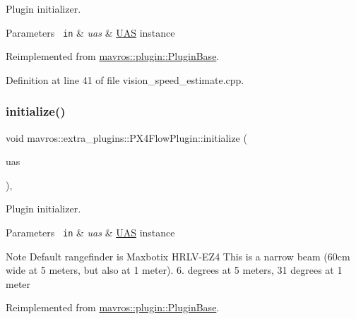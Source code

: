 Plugin initializer. 


\begin{DoxyParams}[1]{Parameters}
\mbox{\texttt{ in}}  & {\em uas} & {\ttfamily \mbox{\hyperlink{classmavros_1_1UAS}{U\+AS}}} instance \\
\hline
\end{DoxyParams}


Reimplemented from \mbox{\hyperlink{group__plugin_gad5313a41da4d26acbbabf008cdc21e82}{mavros\+::plugin\+::\+Plugin\+Base}}.



Definition at line 41 of file vision\+\_\+speed\+\_\+estimate.\+cpp.

\mbox{\label{group__plugin_ga6b15368f120713a52cb776ad210a052b}} 
\subsubsection{\texorpdfstring{initialize()}{initialize()}\hspace{0.1cm}{\footnotesize\ttfamily [21/41]}}
{\footnotesize\ttfamily void mavros\+::extra\+\_\+plugins\+::\+P\+X4\+Flow\+Plugin\+::initialize (\begin{DoxyParamCaption}\item[{\mbox{\hyperlink{classmavros_1_1UAS}{U\+AS}} \&}]{uas }\end{DoxyParamCaption})\hspace{0.3cm}{\ttfamily [inline]}, {\ttfamily [virtual]}}



Plugin initializer. 


\begin{DoxyParams}[1]{Parameters}
\mbox{\texttt{ in}}  & {\em uas} & {\ttfamily \mbox{\hyperlink{classmavros_1_1UAS}{U\+AS}}} instance \\
\hline
\end{DoxyParams}
\begin{DoxyNote}{Note}
Default rangefinder is Maxbotix H\+R\+L\+V-\/\+E\+Z4 This is a narrow beam (60cm wide at 5 meters, but also at 1 meter). 6. degrees at 5 meters, 31 degrees at 1 meter
\end{DoxyNote}


Reimplemented from \mbox{\hyperlink{group__plugin_gad5313a41da4d26acbbabf008cdc21e82}{mavros\+::plugin\+::\+Plugin\+Base}}.




